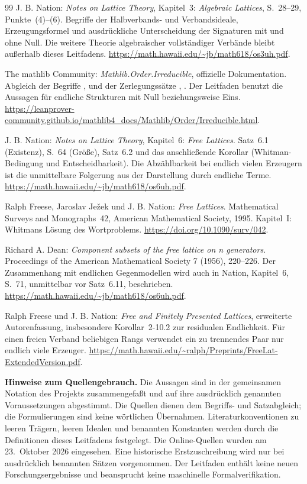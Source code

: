 \begin{thebibliography}{99}
J. B. Nation: \emph{Notes on Lattice Theory}, Kapitel~3:
\emph{Algebraic Lattices}, S.~28--29, Punkte~(4)--(6).
Begriffe der Halbverbands- und Verbandsideale, Erzeugungsformel
und ausdrückliche Unterscheidung der Signaturen mit und ohne Null.
Die weitere Theorie algebraischer vollständiger Verbände bleibt
außerhalb dieses Leitfadens.
\url{https://math.hawaii.edu/~jb/math618/os3uh.pdf}.

The mathlib Community: \emph{Mathlib.Order.Irreducible},
offizielle Dokumentation.
Abgleich der Begriffe ,  und der
Zerlegungssätze ,
.
Der Leitfaden benutzt die Aussagen für endliche Strukturen mit
Null beziehungsweise Eins.
\url{https://leanprover-community.github.io/mathlib4_docs/Mathlib/Order/Irreducible.html}.

J. B. Nation: \emph{Notes on Lattice Theory}, Kapitel~6:
\emph{Free Lattices}.
Satz~6.1 (Existenz), S.~64 (Größe), Satz~6.2 und das anschließende
Korollar (Whitman-Bedingung und Entscheidbarkeit).
Die Abzählbarkeit bei endlich vielen Erzeugern ist die unmittelbare
Folgerung aus der Darstellung durch endliche Terme.
\url{https://math.hawaii.edu/~jb/math618/os6uh.pdf}.

Ralph Freese, Jaroslav Ježek und J. B. Nation:
\emph{Free Lattices}. Mathematical Surveys and Monographs~42,
American Mathematical Society, 1995.
Kapitel~I: Whitmans Lösung des Wortproblems.
\url{https://doi.org/10.1090/surv/042}.

Richard A. Dean:
\emph{Component subsets of the free lattice on n generators}.
Proceedings of the American Mathematical Society 7 (1956), 220--226.
Der Zusammenhang mit endlichen Gegenmodellen wird auch in
Nation, Kapitel~6, S.~71, unmittelbar vor Satz~6.11, beschrieben.
\url{https://math.hawaii.edu/~jb/math618/os6uh.pdf}.

Ralph Freese und J. B. Nation:
\emph{Free and Finitely Presented Lattices}, erweiterte Autorenfassung,
insbesondere Korollar~2-10.2 zur residualen Endlichkeit.
Für einen freien Verband beliebigen Rangs verwendet ein zu
trennendes Paar nur endlich viele Erzeuger.
\url{https://math.hawaii.edu/~ralph/Preprints/FreeLat-ExtendedVersion.pdf}.

\end{thebibliography}

\begingroup
\footnotesize
\noindent\textbf{Hinweise zum Quellengebrauch.}
Die Aussagen sind in der gemeinsamen Notation des Projekts
zusammengefaßt und auf ihre ausdrücklich genannten Voraussetzungen
abgestimmt. Die Quellen dienen dem Begriffs- und Satzabgleich;
die Formulierungen sind keine wörtlichen Übernahmen.
Literaturkonventionen zu leeren Trägern, leeren Idealen und
benannten Konstanten werden durch die Definitionen dieses Leitfadens
festgelegt. Die Online-Quellen wurden am 23.~Oktober 2026 eingesehen.
Eine historische Erstzuschreibung wird nur bei ausdrücklich
benannten Sätzen vorgenommen. Der Leitfaden enthält keine neuen
Forschungsergebnisse und beansprucht keine maschinelle Formalverifikation.
\endgroup
